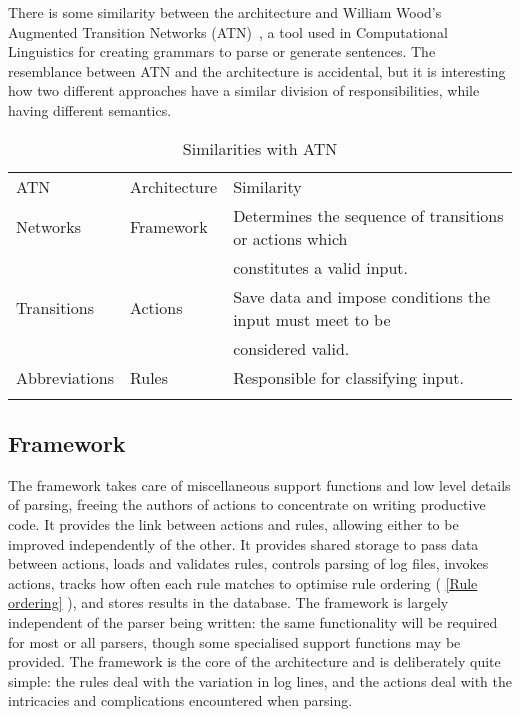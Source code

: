 \documentclass[draft]{svmult}
\newcommand{\sectionref}[1]{%
    \textsection{}\vref*{#1}%
}
\begin{document}
There is some similarity between the architecture and William Wood's
Augmented Transition Networks (ATN)~\cite{atns, nlpip}, a tool used in
Computational Linguistics for creating grammars to parse or generate
sentences.  The resemblance between ATN and the architecture is accidental,
but it is interesting how two different approaches have a similar division
of responsibilities, while having different semantics.


\begin{table}[ht]
    \caption{Similarities with ATN}\label{Similarities with ATN}
    \begin{tabular}[]{lll}
        \hline
        \noalign{\smallskip}
        ATN           & Architecture    & Similarity                          \\
        \noalign{\smallskip}
        \hline
        \noalign{\smallskip}
        Networks      & Framework       & Determines the sequence of
                                          transitions or actions which        \\
                      &                 & constitutes a valid input.          \\
        Transitions   & Actions         & Save data and impose conditions the
                                          input must meet to be               \\
                      &                 & considered valid.                   \\
        Abbreviations & Rules           & Responsible for classifying input.  \\
        \noalign{\smallskip}
        \hline
        \noalign{\smallskip}
    \end{tabular}
\end{table}

\subsection{Framework}

\label{Framework}

The framework takes care of miscellaneous support functions and low level
details of parsing, freeing the authors of actions to concentrate on
writing productive code.  It provides the link between actions and rules,
allowing either to be improved independently of the other.  It provides
shared storage to pass data between actions, loads and validates rules,
controls parsing of log files, invokes actions, tracks how often each rule
matches to optimise rule ordering (\sectionref{Rule ordering}), and stores
results in the database.  The framework is largely independent of the
parser being written: the same functionality will be required for most or
all parsers, though some specialised support functions may be provided.
The framework is the core of the architecture and is deliberately quite
simple: the rules deal with the variation in log lines, and the actions
deal with the intricacies and complications encountered when parsing.
\end{document}
